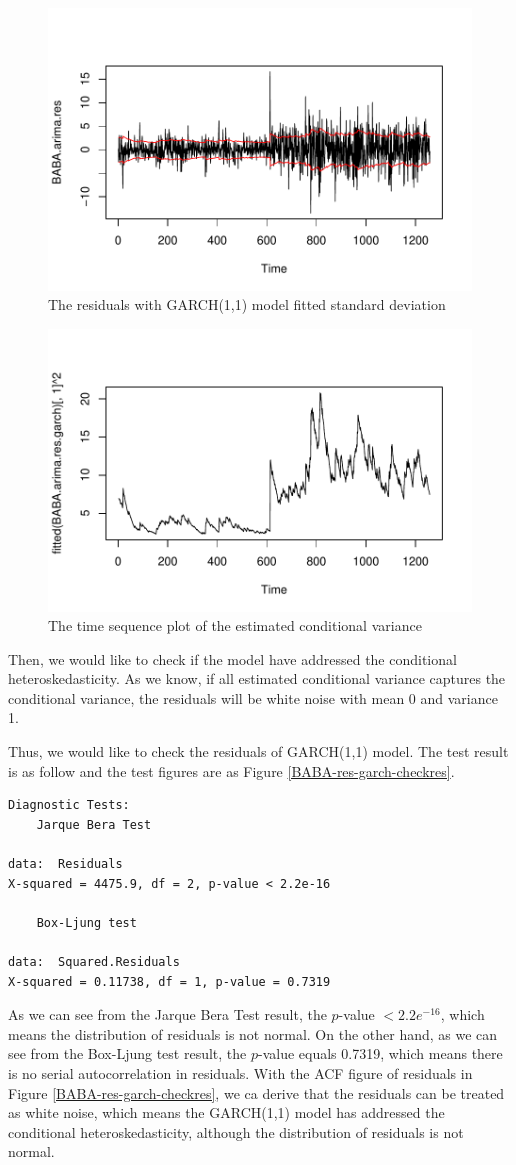 \documentclass{article}
\begin{document}
\begin{figure}[H]
    \centering
    \includegraphics[width=0.7\linewidth]{images/BABA-res-garch-fit}
    \caption{The residuals with GARCH(1,1) model fitted standard deviation}
    \label{BABA-res-garch-fit}
\end{figure}

\begin{figure}[H]
    \centering
    \includegraphics[width=0.7\linewidth]{images/BABA-res-con-variance}
    \caption{The time sequence plot of the estimated conditional variance}
    \label{BABA-res-con-variance}
\end{figure}
Then, we would like to check if the model have addressed the conditional heteroskedasticity. As we know, if all estimated conditional variance captures the conditional variance, the residuals will be white noise with mean 0 and variance 1.

\vspace{4pt}
Thus, we would like to check the residuals of GARCH(1,1) model. The test result is as follow and the test figures are as Figure \ref{BABA-res-garch-checkres}.
\begin{lstlisting}
Diagnostic Tests:
	Jarque Bera Test

data:  Residuals
X-squared = 4475.9, df = 2, p-value < 2.2e-16

	Box-Ljung test

data:  Squared.Residuals
X-squared = 0.11738, df = 1, p-value = 0.7319
\end{lstlisting}
As we can see from the Jarque Bera Test result, the $p$-value $<2.2e^{-16}$, which means the distribution of residuals is not normal. On the other hand, as we can see 
from the Box-Ljung test result, the $p$-value equals 0.7319, which means there is no serial autocorrelation in residuals. With the ACF figure of residuals in
Figure \ref{BABA-res-garch-checkres}, we ca derive that the residuals can be 
treated as white noise, which means the GARCH(1,1) model has addressed the conditional heteroskedasticity, although the distribution of residuals is not normal.
\end{document}
